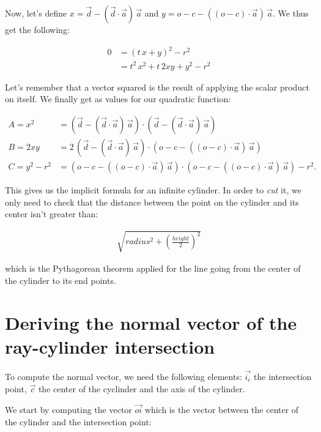 \documentclass{article}
\newcommand{\vecb}[1]{\overrightarrow{#1}}
\begin{document}
    Now, let's define $x = \vec{d} - (\vec{d} \cdot \vec{a}) \, \vec{a}$ and $y = o - c - ((o - c) \cdot \vec{a}) \, \vec{a}$.
    We thus get the following:
    
    \begin{align*}
        0 &= \left(t \, x + y\right)^2 - r^2\\
        &= t^2 \, x^2 + t \, 2xy + y^2 - r^2
    \end{align*}
    
    Let's remember that a vector squared is the result of applying the scalar product on itself.
    We finally get as values for our quadratic function:
    
    \begin{align*}
        A = x^2 &= \left(\vec{d} - (\vec{d} \cdot \vec{a}) \, \vec{a}\right) \cdot \left(\vec{d} - (\vec{d} \cdot \vec{a}) \, \vec{a}\right)\\
        B = 2xy &= 2 \, \left(\vec{d} - (\vec{d} \cdot \vec{a}) \, \vec{a}\right) \cdot \left(o - c - ((o - c) \cdot \vec{a}) \, \vec{a}\right)\\
        C = y^2 - r^2 &= \left(o - c - ((o - c) \cdot \vec{a}) \, \vec{a}\right) \cdot \left(o - c - ((o - c) \cdot \vec{a}) \, \vec{a}\right) - r^2.
    \end{align*}

    This gives us the implicit formula for an infinite cylinder.
    In order to \textit{cut} it, we only need to check that the distance between the point on the cylinder and its center isn't greater than:

    \begin{align*}
        \sqrt{radius^2 + \left(\frac{height}{2}\right)^2}
    \end{align*}

    which is the Pythagorean theorem applied for the line going from the center of the cylinder to its end points.

    \section{Deriving the normal vector of the ray-cylinder intersection}

    To compute the normal vector, we need the following elements: $\vecb{i_c}$ the intersection point, $\vec{c}$ the center of the cyclinder and the axis of the cylinder.

    We start by computing the vector $\vec{oi}$ which is the vector between the center of the cylinder and the intersection point:
\end{document}
